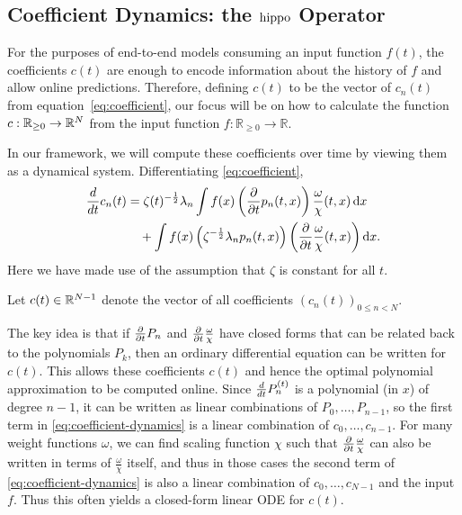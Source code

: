 \documentclass[../hippo.tex]{subfiles}
\begin{document}
\subsection{Coefficient Dynamics: the $\operatorname{hippo}$ Operator}
\label{sec:hippo-dynamics}

For the purposes of end-to-end models consuming an input function $f(t)$, the coefficients $c(t)$ are enough to encode information about the history of $f$ and allow online predictions.
Therefore, defining $c(t)$ to be the vector of $c_n(t)$ from equation~\eqref{eq:coefficient},
our focus will be on how to calculate the function $c : \mathbb{R}_{\ge 0} \to \mathbb{R}^N$ from the input function $f : \mathbb{R}_{\ge 0} \to \mathbb{R}$.

In our framework, we will compute these coefficients over time by viewing them as a dynamical system.
Differentiating \eqref{eq:coefficient},
\begin{equation}
  \label{eq:coefficient-dynamics}
  \begin{aligned}
    \frac{d}{d t} c_n(t)
    &= \zeta(t)^{-\frac{1}{2}} \lambda_n \int f(x) \left(\frac{\partial}{\partial t} p_n(t, x)\right) \frac{\omega}{\chi}(t, x) \mathop{}\!\mathrm{d} x
    \\
    &\quad + \int f(x) \left( \zeta^{-\frac{1}{2}} \lambda_n p_n(t, x) \right) \left(\frac{\partial}{\partial t} \frac{\omega}{\chi}(t, x)\right) \mathop{}\!\mathrm{d} x
    .
  \end{aligned}
\end{equation}
Here we have made use of the assumption that $\zeta$ is constant for all $t$.

Let $c(t) \in \mathbb{R}^{N-1}$ denote the vector of all coefficients $(c_n(t))_{0 \le n < N}$.


The key idea is that if $\frac{\partial}{\partial t} P_n$ and $\frac{\partial}{\partial t} \frac{\omega}{\chi}$ have closed forms that can be related back to the polynomials $P_k$, then an ordinary differential equation can be written for $c(t)$.
This allows these coefficients $c(t)$ and hence the optimal polynomial approximation to be computed online.
Since $\frac{d}{d t} P_n^{(t)}$ is a polynomial (in $x$) of degree $n-1$, it can be written as linear
combinations of $P_0, \dots, P_{n-1}$, so the first term in
\cref{eq:coefficient-dynamics} is a linear combination of $c_0, \dots, c_{n-1}$.
For many weight functions $\omega$, we can find scaling function $\chi$ such that $\frac{\partial}{\partial t} \frac{\omega}{\chi}$ can also be written in terms of $\frac{\omega}{\chi}$
itself, and thus in those cases the second term of \cref{eq:coefficient-dynamics} is also
a linear combination of $c_0, \dots, c_{N-1}$ and the input $f$.
Thus this often yields a closed-form linear ODE for $c(t)$.
\end{document}
